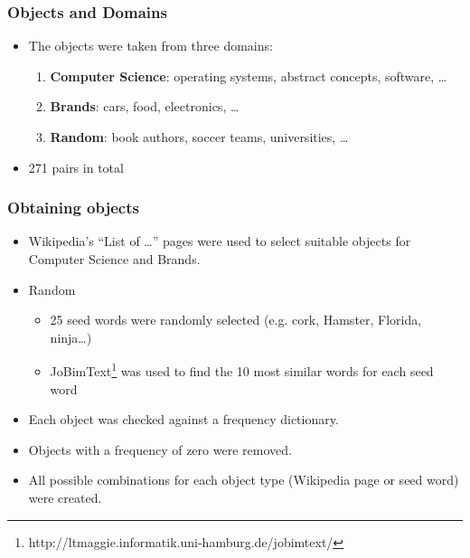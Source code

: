 \documentclass[11pt,aspectratio=169,usenames,dvipsnames]{beamer}
\begin{document}
    \begin{frame}[t]
        \frametitle{Objects and Domains}
        \begin{itemize}
            \item The objects were taken from three domains:
            \begin{enumerate}
            \item \textbf{Computer Science}: operating systems, abstract concepts, software, \ldots
            \item \textbf{Brands}: cars, food, electronics, \ldots
            \item \textbf{Random}: book authors, soccer teams, universities, \ldots
            \end{enumerate}
            \item 271 pairs in total

        \end{itemize}
    \end{frame}

    \begin{frame}[t]
        \frametitle{Obtaining objects}
        \begin{itemize}
            \item Wikipedia's \enquote{List of \ldots} pages were used to select suitable objects for Computer Science and Brands.\pause
            \item Random
            \begin{itemize}
                \item 25 seed words were randomly selected (e.g. cork, Hamster, Florida, ninja\ldots)
                \item JoBimText\footnote{http://ltmaggie.informatik.uni-hamburg.de/jobimtext/} was used to find the 10 most similar words for each seed word
            \end{itemize}\pause
            \item Each object was checked against a frequency dictionary.
            \item Objects with a frequency of zero were removed.
            \item All possible combinations for each object type (Wikipedia page or seed word) were created.
        \end{itemize}

    \end{frame}
\end{document}
